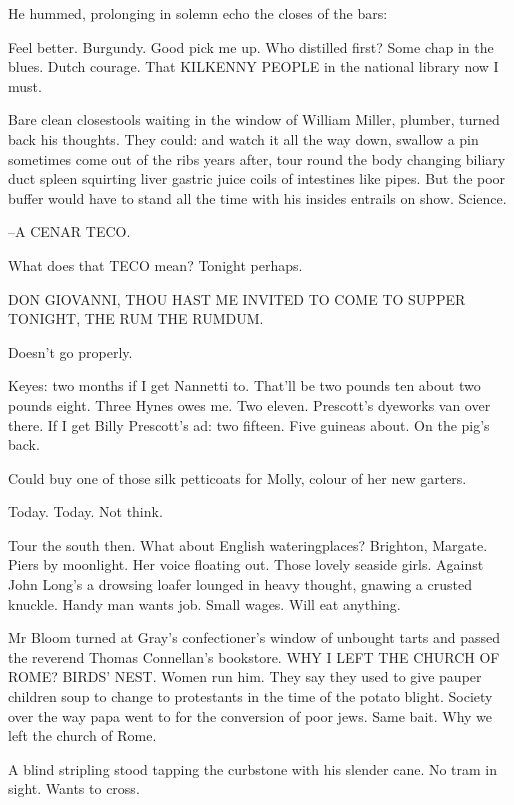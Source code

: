 He hummed,
prolonging in solemn echo the closes of the bars:



Feel better.
Burgundy.
Good pick me up.
Who distilled first?
Some chap in the blues.
Dutch courage.
That KILKENNY PEOPLE in the national library now I must.

Bare clean closestools waiting in the window of William Miller, plumber,
turned back his thoughts.
They could:
and watch it all the way down,
swallow a pin sometimes come out of the ribs years after,
tour round the body changing biliary duct spleen
squirting liver gastric juice
coils of intestines like pipes.
But the poor buffer would have to stand
all the time with his insides entrails on show.
Science.

--A CENAR TECO.

What does that TECO mean?
Tonight perhaps.


    DON GIOVANNI,
THOU HAST ME INVITED
    TO COME TO SUPPER TONIGHT,
    THE RUM THE RUMDUM.


Doesn't go properly.

Keyes: two months if I get Nannetti to.
That'll be two pounds ten
about two pounds eight.
Three Hynes owes me.
Two eleven.
Prescott's dyeworks van over there.
If I get Billy Prescott's ad:
two fifteen.
Five guineas about.
On the pig's back.

Could buy one of those silk petticoats for Molly,
colour of her new garters.

Today.
Today.
Not think.

Tour the south then.
What about English wateringplaces?
Brighton, Margate.
Piers by moonlight.
Her voice floating out.
Those lovely seaside girls.
Against John Long's
a drowsing loafer lounged in heavy thought,
gnawing a crusted knuckle.
Handy man wants job.
Small wages.
Will eat anything.

Mr Bloom turned at Gray's confectioner's window of unbought tarts
and passed the reverend Thomas Connellan's bookstore.
WHY I LEFT THE CHURCH OF ROME?
BIRDS' NEST.
Women run him.
They say they used to give pauper children soup
to change to protestants in the time of the potato blight.
Society over the way papa went to for the conversion of poor jews.
Same bait.
Why we left the church of Rome.

A blind stripling stood tapping the curbstone with his slender cane.
No tram in sight.
Wants to cross.

